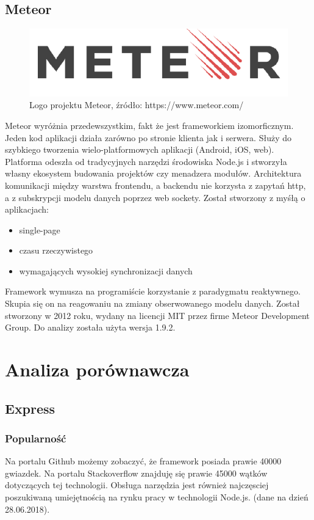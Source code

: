 \documentclass[12pt]{report}
\begin{document}
  \section{Meteor}
    \begin{figure}[!hb]
      \centering
      \includegraphics[width=\textwidth,height=\textheight,keepaspectratio]{logo_meteor.png} 
      \caption{Logo projektu Meteor, źródło: https://www.meteor.com/}
    \end{figure}
    Meteor wyróżnia przedewszystkim, fakt że jest frameworkiem izomorficznym. 
    Jeden kod aplikacji działa zarówno po stronie klienta jak i serwera.
    Służy do szybkiego tworzenia wielo-platformowych aplikacji (Android, iOS, web).
    Platforma odeszła od tradycyjnych narzędzi środowiska Node.js i stworzyła własny ekosystem budowania projektów czy menadzera modułów.
    Architektura komunikacji między warstwa frontendu, a backendu nie korzysta z zapytań http, a z subskrypcji modelu danych poprzez web sockety.
    Został stworzony z myśłą o aplikacjach:
    \begin{itemize}
      \item single-page 
      \item czasu rzeczywistego
      \item wymagających wysokiej synchronizacji danych
    \end{itemize} 
    Framework wymusza na programiście korzystanie z paradygmatu reaktywnego.
    Skupia się on na reagowaniu na zmiany obserwowanego modelu danych.
    Został stworzony w 2012 roku, wydany na licencji MIT przez firme Meteor Development Group.
    Do analizy została użyta wersja 1.9.2.

\chapter{Analiza porównawcza}

  \section{Express}
    \subsection{Popularność}
      Na portalu Github możemy zobaczyć, że framework posiada prawie 40000 gwiazdek.
      Na portalu Stackoverflow znajduję się prawie 45000 wątków dotyczących tej technologii.
      Obsługa narzędzia jest również najczęsciej poszukiwaną umiejętnością na rynku pracy w technologii Node.js.
      (dane na dzień 28.06.2018).
\end{document}
